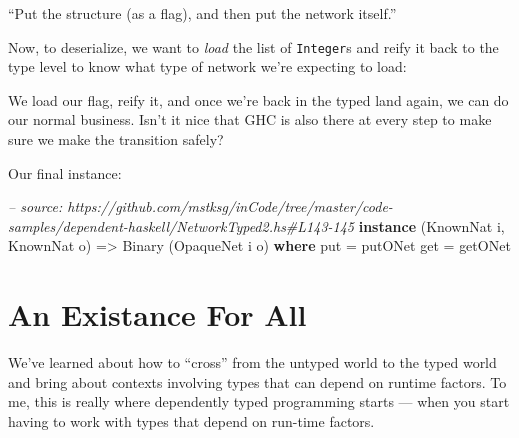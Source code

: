 \documentclass[]{article}
\newenvironment{Shaded}{}{}
\newcommand{\KeywordTok}[1]{\textcolor[rgb]{0.00,0.44,0.13}{\textbf{{#1}}}}
\newcommand{\DataTypeTok}[1]{\textcolor[rgb]{0.56,0.13,0.00}{{#1}}}
\newcommand{\CommentTok}[1]{\textcolor[rgb]{0.38,0.63,0.69}{\textit{{#1}}}}
\newcommand{\OtherTok}[1]{\textcolor[rgb]{0.00,0.44,0.13}{{#1}}}
\newcommand{\FunctionTok}[1]{\textcolor[rgb]{0.02,0.16,0.49}{{#1}}}
\newcommand{\NormalTok}[1]{{#1}}
\begin{document}
``Put the structure (as a flag), and then put the network itself.''

Now, to deserialize, we want to \emph{load} the list of \texttt{Integer}s and
reify it back to the type level to know what type of network we're expecting to
load:

\begin{Shaded}
\end{Shaded}

We load our flag, reify it, and once we're back in the typed land again, we can
do our normal business. Isn't it nice that GHC is also there at every step to
make sure we make the transition safely?

Our final instance:

\begin{Shaded}
\begin{Highlighting}[]
\CommentTok{-- source: https://github.com/mstksg/inCode/tree/master/code-samples/dependent-haskell/NetworkTyped2.hs#L143-145}
\KeywordTok{instance} \NormalTok{(}\DataTypeTok{KnownNat} \NormalTok{i, }\DataTypeTok{KnownNat} \NormalTok{o) }\OtherTok{=>} \DataTypeTok{Binary} \NormalTok{(}\DataTypeTok{OpaqueNet} \NormalTok{i o) }\KeywordTok{where}
    \NormalTok{put }\FunctionTok{=} \NormalTok{putONet}
    \NormalTok{get }\FunctionTok{=} \NormalTok{getONet}
\end{Highlighting}
\end{Shaded}

\section{An Existance For All}\label{an-existance-for-all}

We've learned about how to ``cross'' from the untyped world to the typed world
and bring about contexts involving types that can depend on runtime factors. To
me, this is really where dependently typed programming starts --- when you start
having to work with types that depend on run-time factors.
\end{document}
